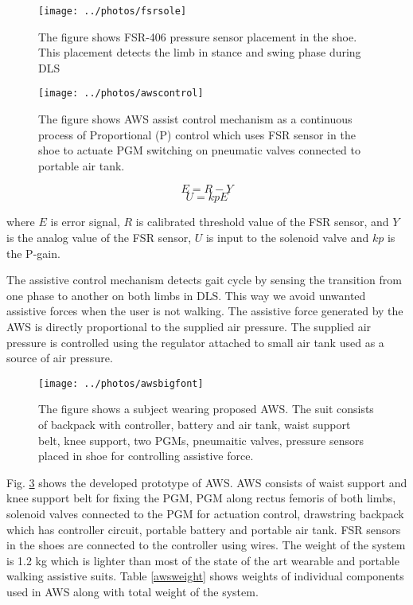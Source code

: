 \documentclass[letterpaper, 10 pt, conference]{ieeeconf}  %
\begin{document}
\begin{figure}
	\centering
	\texttt{[image: ../photos/fsrsole]}
	\caption{The figure shows FSR-406 pressure sensor placement in the shoe. This placement detects the limb in stance and swing phase during DLS}
	\label{fig:fsrsole}
\end{figure}

\begin{figure}
	\centering
	\texttt{[image: ../photos/awscontrol]}
	\caption{The figure shows AWS assist control mechanism as a continuous process of Proportional (P) control which uses FSR sensor in the shoe to actuate PGM switching on pneumatic valves connected to portable air tank.}
	\label{fig:awssystem}
\end{figure}
\begin{equation}\label{kevalue}
E = R - Y 
\end{equation}
\begin{equation}\label{uvalue}
U = kpE
\end{equation}

where $E$ is error signal, $R$ is calibrated threshold value of the FSR sensor, and $Y$ is the analog value of the FSR sensor, $U$ is input to the solenoid valve and $kp$ is the P-gain. 

The assistive control mechanism detects gait cycle by sensing the transition from one phase to another on both limbs in DLS. This way we avoid unwanted assistive forces when the user is not walking. The assistive force generated by the AWS is directly proportional to the supplied air pressure. The supplied air pressure is controlled using the regulator attached to small air tank used as a source of air pressure.  

\begin{figure}
	\centering
	\texttt{[image: ../photos/awsbigfont]}
	\caption{The figure shows a subject wearing proposed AWS. The suit consists of backpack with controller, battery and air tank, waist support belt, knee support, two PGMs, pneumaitic valves, pressure sensors placed in shoe for controlling assistive force.}
	\label{fig:awsbigfont}
\end{figure}

Fig. \ref{fig:awsbigfont} shows the developed prototype of AWS. AWS consists of waist support and knee support belt for fixing the PGM, PGM along rectus femoris of both limbs, solenoid valves connected to the PGM for actuation control, drawstring backpack which has controller circuit, portable battery and portable air tank. FSR sensors in the shoes are connected to the controller using wires. The weight of the system is 1.2 kg which is lighter than most of the state of the art wearable and portable walking assistive suits. Table \ref{awsweight} shows weights of individual components used in AWS along with total weight of the system.
\end{document}
